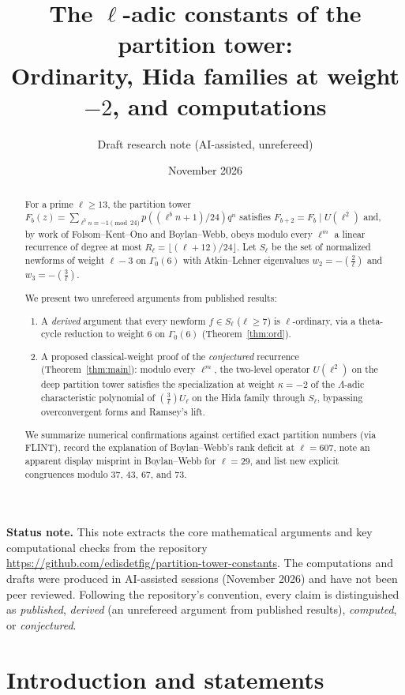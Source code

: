 \documentclass[11pt,reqno]{amsart}
\title[The $\ell$-adic constants of the partition tower]{The $\ell$-adic constants of the partition tower:\\
Ordinarity, Hida families at weight $-2$, and computations}
\author{Draft research note (AI-assisted, unrefereed)}
\date{November 2026}
\theoremstyle{definition}
\theoremstyle{remark}
\newcommand{\legendre}[2]{\left(\frac{#1}{#2}\right)}
\begin{document}
\begin{abstract}
For a prime $\ell \ge 13$, the partition tower $F_b(z) = \sum_{\ell^b n \equiv -1 \pmod{24}} p((\ell^b n + 1)/24) q^n$ satisfies $F_{b+2} = F_b \mid U(\ell^2)$ and, by work of Folsom--Kent--Ono and Boylan--Webb, obeys modulo every $\ell^m$ a linear recurrence of degree at most $R_\ell = \lfloor(\ell+12)/24\rfloor$. Let $S_\ell$ be the set of normalized newforms of weight $\ell - 3$ on $\Gamma_0(6)$ with Atkin--Lehner eigenvalues $w_2 = -\legendre{2}{\ell}$ and $w_3 = -\legendre{3}{\ell}$.

We present two unrefereed arguments from published results:
\begin{enumerate}
  \item A \emph{derived} argument that every newform $f \in S_\ell$ ($\ell \ge 7$) is $\ell$-ordinary, via a theta-cycle reduction to weight $6$ on $\Gamma_0(6)$ (Theorem~\ref{thm:ord}).
  \item A proposed classical-weight proof of the \emph{conjectured} recurrence (Theorem~\ref{thm:main}): modulo every $\ell^m$, the two-level operator $U(\ell^2)$ on the deep partition tower satisfies the specialization at weight $\kappa = -2$ of the $\Lambda$-adic characteristic polynomial of $\legendre{3}{\ell} U_\ell$ on the Hida family through $S_\ell$, bypassing overconvergent forms and Ramsey's lift.
\end{enumerate}
We summarize numerical confirmations against certified exact partition numbers (via FLINT), record the explanation of Boylan--Webb's rank deficit at $\ell = 607$, note an apparent display misprint in Boylan--Webb for $\ell = 29$, and list new explicit congruences modulo $37$, $43$, $67$, and $73$.
\end{abstract}

\maketitle

\noindent\textbf{Status note.}
This note extracts the core mathematical arguments and key computational checks from the repository \url{https://github.com/edisdetfig/partition-tower-constants}. The computations and drafts were produced in AI-assisted sessions (November 2026) and have not been peer reviewed. Following the repository's convention, every claim is distinguished as \emph{published}, \emph{derived} (an unrefereed argument from published results), \emph{computed}, or \emph{conjectured}.

\section{Introduction and statements}
\end{document}
